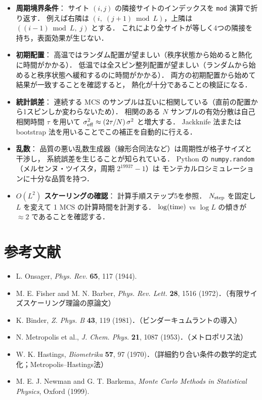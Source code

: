 \documentclass[12pt,a4paper]{ltjsarticle}
\begin{document}
\begin{itemize}
  \item \textbf{周期境界条件}：
        サイト $(i,j)$ の隣接サイトのインデックスを \texttt{mod} 演算で折り返す．
        例えば右隣は $(i,\; (j+1) \bmod L)$，上隣は $((i-1) \bmod L,\; j)$ とする．
        これにより全サイトが等しく4つの隣接を持ち，表面効果が生じない．

  \item \textbf{初期配置}：
        高温ではランダム配置が望ましい（秩序状態から始めると熱化に時間がかかる）．
        低温では全スピン整列配置が望ましい（ランダムから始めると秩序状態へ緩和するのに時間がかかる）．
        両方の初期配置から始めて結果が一致することを確認すると，
        熱化が十分であることの検証になる．

  \item \textbf{統計誤差}：
        連続する MCS のサンプルは互いに相関している（直前の配置から1スピンしか変わらないため）．
        相関のある $N$ サンプルの有効分散は自己相関時間 $\tau$ を用いて
        $\sigma^2_{\rm eff} \approx (2\tau/N)\,\sigma^2$ と増大する．
        Jackknife 法または bootstrap 法を用いることでこの補正を自動的に行える．

  \item \textbf{乱数}：
        品質の悪い乱数生成器（線形合同法など）は周期性が格子サイズと干渉し，
        系統誤差を生じることが知られている．
        Python の \texttt{numpy.random}（メルセンヌ・ツイスタ，周期 $2^{19937}-1$）は
        モンテカルロシミュレーションに十分な品質を持つ．

  \item \textbf{$O(L^2)$ スケーリングの確認}：
        計算手順ステップ5を参照．
        $N_{\rm step}$ を固定し $L$ を変えて 1 MCS の計算時間を計測する．
        $\log({\rm time})$ vs $\log L$ の傾きが $\approx 2$ であることを確認する．
\end{itemize}

\appendix
\section{参考文献}

\begin{itemize}
  \item L. Onsager, \textit{Phys. Rev.} \textbf{65}, 117 (1944).
  \item M. E. Fisher and M. N. Barber, \textit{Phys. Rev. Lett.} \textbf{28}, 1516 (1972)．（有限サイズスケーリング理論の原論文）
  \item K. Binder, \textit{Z. Phys. B} \textbf{43}, 119 (1981)．（ビンダーキュムラントの導入）
  \item N. Metropolis et al., \textit{J. Chem. Phys.} \textbf{21}, 1087 (1953)．（メトロポリス法）
  \item W. K. Hastings, \textit{Biometrika} \textbf{57}, 97 (1970)．（詳細釣り合い条件の数学的定式化；Metropolis--Hastings法）
  \item M. E. J. Newman and G. T. Barkema,
        \textit{Monte Carlo Methods in Statistical Physics}, Oxford (1999).
\end{itemize}
\end{document}
